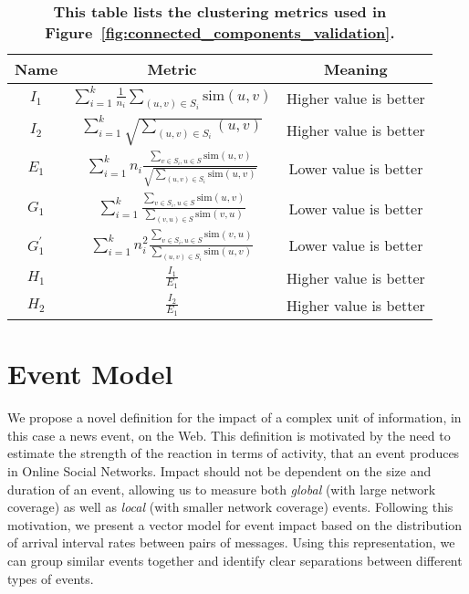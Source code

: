 \begin{table}
  \centering
  \begin{tabular}{ c  c  c }
    \toprule
    Name & Metric & Meaning \\
    \midrule
    $I_1$ & $\sum_{i=1}^k \frac{1}{n_i} \sum_{(u,v) \in S_i} \text{sim}(u,v)$ & Higher value is better\\
    \midrule
    $I_2$ & $\sum_{i=1}^k \sqrt{ \sum_{(u,v) \in S_i} (u,v)}$ & Higher value is better \\
    \midrule
    $E_1$ & $\sum_{i=1}^{k} n_i \frac{\sum_{v \in S_i, u \in S} \text{sim}(u,v)}{\sqrt{\sum_{(u,v) \in S_i} \text{sim}(u,v)}}$ & Lower value is better \\
    \midrule
    $G_1$ & $\sum_{i=1}^k \frac{\sum_{v \in S_i, u \in S}\text{sim}(u,v)}{\sum_{(v,u) \in S}\text{sim}(v,u)}$ & Lower value is better \\
    \midrule
    $G_1^{'}$ & $\sum_{i=1}^k n_i^2 \frac{\sum_{v \in S_i, u \in S}\text{sim}(v,u)}{\sum_{(u,v) \in S_i}\text{sim}(u,v)}$ & Lower value is better \\
    \midrule
    $H_1$ & $\frac{I_1}{E_1}$ & Higher value is better \\
    \midrule
    $H_2$ & $\frac{I_2}{E_1}$ & Higher value is better \\
    \bottomrule
  \end{tabular}
  \caption{\textbf{This table lists the clustering metrics used in Figure~\ref{fig:connected_components_validation}.}}
  \label{table:clustering_metrics}
\end{table}


\section{Event Model}
We propose a novel definition for the impact of a complex unit of
information, in this case a news event, on the Web. This definition is
motivated by the need to estimate the strength of the reaction in
terms of activity, that an event produces in Online Social Networks.
Impact should not be dependent on the size and duration of an event,
allowing us to measure both {\em global} (with large network coverage)
as well as {\em local} (with smaller network coverage) events.
Following this motivation, we present a vector model for event impact
based on the distribution of arrival interval rates between pairs of
messages. Using this representation, we can group similar events
together and identify clear separations between different types of
events.

